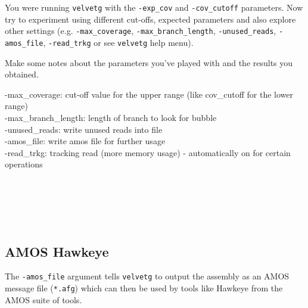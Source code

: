 \begin{steps}
You were running \texttt{velvetg} with the \texttt{-exp\_cov} and
\texttt{-cov\_cutoff} parameters. Now try to experiment using different
cut-offs, expected parameters and also explore other settings (e.g.
\texttt{-max\_coverage}, \texttt{-max\_branch\_length}, \texttt{-unused\_reads},
\texttt{-amos\_file}, \texttt{-read\_trkg} or see \texttt{velvetg} help menu).
\end{steps}

\begin{questions}
Make some notes about the parameters you've played with and the results you
obtained.
\begin{answer}
-max\_coverage: cut-off value for the upper range (like cov\_cutoff for the lower range)\\
-max\_branch\_length: length of branch to look for bubble\\
-unused\_reads: write unused reads into file\\
-amos\_file: write amos file for further usage\\
-read\_trkg: tracking read (more memory usage) - automatically on for certain operations\\
\end{answer}
\\
\\
\\
\\
\end{questions}

\subsection{AMOS Hawkeye}

The \texttt{-amos\_file} argument tells \texttt{velvetg} to output the assembly
as an AMOS message file (\texttt{*.afg}) which can then be used by tools like
Hawkeye from the AMOS suite of tools.

